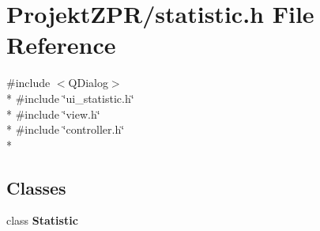 \section{Projekt\-Z\-P\-R/statistic.h File Reference}
\label{statistic_8h}
{\ttfamily \#include $<$Q\-Dialog$>$}\\*
{\ttfamily \#include \char`\"{}ui\-\_\-statistic.\-h\char`\"{}}\\*
{\ttfamily \#include \char`\"{}view.\-h\char`\"{}}\\*
{\ttfamily \#include \char`\"{}controller.\-h\char`\"{}}\\*
\subsection*{Classes}
\begin{DoxyCompactItemize}
\item 
class {\bf Statistic}
\end{DoxyCompactItemize}
